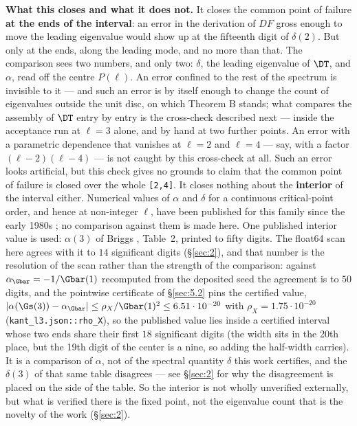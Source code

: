 \textbf{What this closes and what it does not.} It closes the common point of failure \textbf{at the ends of the interval}: an error in the derivation of $DF$ gross enough to move the leading eigenvalue would show up at the fifteenth digit of $\delta(2)$. But only at the ends, along the leading mode, and no more than that. The comparison sees two numbers, and only two: $\delta$, the leading eigenvalue of $\DT$, and $\alpha$, read off the centre $P(\ell)$. An error confined to the rest of the spectrum is invisible to it --- and such an error is by itself enough to change the count of eigenvalues outside the unit disc, on which Theorem B stands;
what compares the assembly of $\DT$ entry by entry is the cross-check described next --- inside the acceptance run at $\ell = 3$ alone, and by hand at two further points. An error with a parametric dependence that vanishes at $\ell = 2$ and $\ell = 4$ --- say, with a factor $(\ell-2)(\ell-4)$ --- is not caught by this cross-check at all. Such an error looks artificial, but this check gives no grounds to claim that the common point of failure is closed over the whole \texttt{[2,4]}.
It closes nothing about the \textbf{interior} of the interval either. Numerical values of
$\alpha$ and $\delta$ for a continuous critical-point order, and hence at non-integer
$\ell$, have been published for this family since the early 1980s
\cite{humao1982period, vanderweele1987period}; no comparison against them is made here.
One published interior value is used: $\alpha(3)$ of Briggs \cite{briggs1991precise},
Table~2, printed to fifty digits. The float64 scan here agrees with it to $14$
significant digits (\S\ref{sec:2}), and that number is the resolution of the
scan rather than the strength of the comparison: against
$\alpha_{\Gbar} = -1/\Gbar(1)$ recomputed from the deposited seed the agreement is
to $50$ digits, and the pointwise certificate of \S\ref{sec:5.2} pins the
certified value, $|\alpha(\Gs(3)) - \alpha_{\Gbar}| \le \rho_{X}/\Gbar(1)^{2}
\le 6.51\cdot 10^{-20}$ with $\rho_{X} = 1.75\cdot 10^{-20}$
(\texttt{kant\_\allowbreak l3.json::\allowbreak rho\_\allowbreak X}), so the
published value lies inside a certified interval whose two ends share their first $18$ significant digits (the width sits in the 20th place, but the 19th digit of the center is a nine, so adding the half-width carries). It is a comparison of $\alpha$, not of the spectral quantity
$\delta$ this work certifies, and the $\delta(3)$ of that same table disagrees ---
see \S\ref{sec:2} for why the disagreement is placed on the side of the table. So the
interior is not wholly unverified externally, but what is verified there is the fixed
point, not the eigenvalue count that is the novelty of the work (\S\ref{sec:2}).

